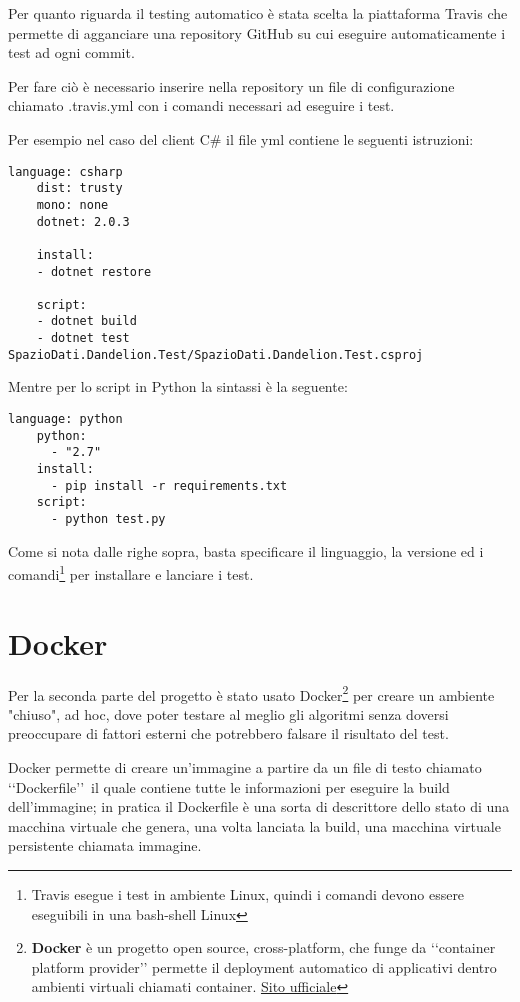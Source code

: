 Per quanto riguarda il testing automatico è stata scelta la piattaforma Travis che permette di agganciare una repository GitHub su cui eseguire automaticamente i test 
ad ogni commit. 

Per fare ciò è necessario inserire nella repository un file di configurazione chiamato .travis.yml con i comandi necessari ad eseguire i test. 

Per esempio nel caso del client C$\#$ il file yml contiene le seguenti istruzioni:

\begin{lstlisting}[style=YmlStyle, caption=File configurazione travis.yml per progetti C$\#$]
    language: csharp
    dist: trusty
    mono: none
    dotnet: 2.0.3

    install:
    - dotnet restore

    script:
    - dotnet build
    - dotnet test SpazioDati.Dandelion.Test/SpazioDati.Dandelion.Test.csproj
\end{lstlisting}

Mentre per lo script in Python la sintassi è la seguente:
\begin{lstlisting}[style=YmlStyle, caption=File configurazione travis.yml per progetti Python]
    language: python
    python: 
      - "2.7"
    install:
      - pip install -r requirements.txt
    script:
      - python test.py
\end{lstlisting}

Come si nota dalle righe sopra, basta specificare il linguaggio, la versione ed i comandi\footnote{
    Travis esegue i test in ambiente Linux, quindi i comandi devono essere eseguibili in una bash-shell Linux
}
per installare e lanciare i test.

\section{Docker}
Per la seconda parte del progetto è stato usato Docker\footnote{
    \textbf{Docker} è un progetto open source, cross-platform, che funge da \lq\lq container platform provider\rq\rq\; 
    permette il deployment automatico di applicativi dentro ambienti virtuali chiamati container. \href{https://www.docker.com}{Sito ufficiale}
} per creare un ambiente "chiuso", ad hoc, dove poter testare al meglio gli algoritmi senza doversi preoccupare di fattori esterni che potrebbero falsare 
il risultato del test. 

Docker permette di creare un'immagine a partire da un file di testo chiamato \lq\lq Dockerfile\rq\rq\ il quale contiene tutte le informazioni per eseguire la build dell'immagine; in pratica 
il Dockerfile è una sorta di descrittore dello stato di una macchina virtuale che genera, una volta lanciata la build, una macchina virtuale persistente chiamata immagine. 

